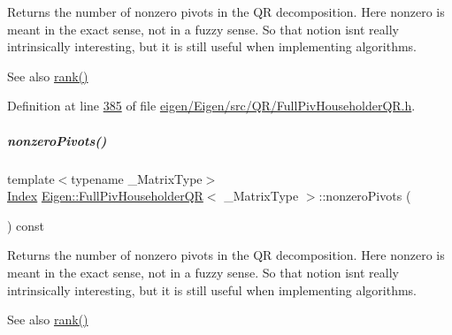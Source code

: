 \begin{DoxyReturn}{Returns}
the number of nonzero pivots in the QR decomposition. Here nonzero is meant in the exact sense, not in a fuzzy sense. So that notion isn\textquotesingle{}t really intrinsically interesting, but it is still useful when implementing algorithms.
\end{DoxyReturn}
\begin{DoxySeeAlso}{See also}
\hyperlink{group___q_r___module_aeae555220f46477818ccc94aca2de770}{rank()} 
\end{DoxySeeAlso}


Definition at line \hyperlink{eigen_2_eigen_2src_2_q_r_2_full_piv_householder_q_r_8h_source_l00385}{385} of file \hyperlink{eigen_2_eigen_2src_2_q_r_2_full_piv_householder_q_r_8h_source}{eigen/\+Eigen/src/\+Q\+R/\+Full\+Piv\+Householder\+Q\+R.\+h}.

\mbox{\label{group___q_r___module_af1e4d04824084a964c1a6e51db68376f}} 
\subparagraph{\texorpdfstring{nonzero\+Pivots()}{nonzeroPivots()}\hspace{0.1cm}{\footnotesize\ttfamily [2/2]}}
{\footnotesize\ttfamily template$<$typename \+\_\+\+Matrix\+Type$>$ \\
\hyperlink{namespace_eigen_a62e77e0933482dafde8fe197d9a2cfde}{Index} \hyperlink{group___q_r___module_class_eigen_1_1_full_piv_householder_q_r}{Eigen\+::\+Full\+Piv\+Householder\+QR}$<$ \+\_\+\+Matrix\+Type $>$\+::nonzero\+Pivots (\begin{DoxyParamCaption}{ }\end{DoxyParamCaption}) const\hspace{0.3cm}{\ttfamily [inline]}}

\begin{DoxyReturn}{Returns}
the number of nonzero pivots in the QR decomposition. Here nonzero is meant in the exact sense, not in a fuzzy sense. So that notion isn\textquotesingle{}t really intrinsically interesting, but it is still useful when implementing algorithms.
\end{DoxyReturn}
\begin{DoxySeeAlso}{See also}
\hyperlink{group___q_r___module_aeae555220f46477818ccc94aca2de770}{rank()} 
\end{DoxySeeAlso}


